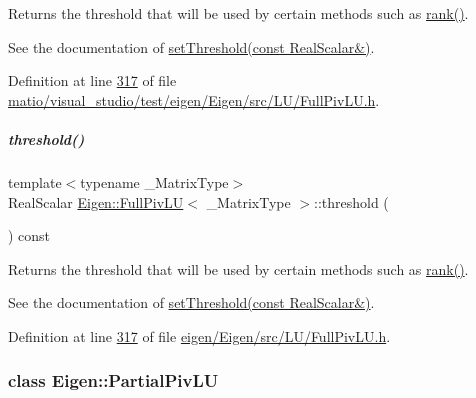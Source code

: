 Returns the threshold that will be used by certain methods such as \hyperlink{group___l_u___module_a67a870aa69e699e058d04802ba0bdad9}{rank()}.

See the documentation of \hyperlink{group___l_u___module_a414592d82de98f5bd075965caf56d681}{set\+Threshold(const Real\+Scalar\&)}. 

Definition at line \hyperlink{matio_2visual__studio_2test_2eigen_2_eigen_2src_2_l_u_2_full_piv_l_u_8h_source_l00317}{317} of file \hyperlink{matio_2visual__studio_2test_2eigen_2_eigen_2src_2_l_u_2_full_piv_l_u_8h_source}{matio/visual\+\_\+studio/test/eigen/\+Eigen/src/\+L\+U/\+Full\+Piv\+L\+U.\+h}.

\mbox{\label{group___l_u___module_ad77539203694f2d85ff7d11616e5a0a5}} 
\subparagraph{\texorpdfstring{threshold()}{threshold()}\hspace{0.1cm}{\footnotesize\ttfamily [2/2]}}
{\footnotesize\ttfamily template$<$typename \+\_\+\+Matrix\+Type$>$ \\
Real\+Scalar \hyperlink{group___l_u___module_class_eigen_1_1_full_piv_l_u}{Eigen\+::\+Full\+Piv\+LU}$<$ \+\_\+\+Matrix\+Type $>$\+::threshold (\begin{DoxyParamCaption}{ }\end{DoxyParamCaption}) const\hspace{0.3cm}{\ttfamily [inline]}}

Returns the threshold that will be used by certain methods such as \hyperlink{group___l_u___module_a67a870aa69e699e058d04802ba0bdad9}{rank()}.

See the documentation of \hyperlink{group___l_u___module_a414592d82de98f5bd075965caf56d681}{set\+Threshold(const Real\+Scalar\&)}. 

Definition at line \hyperlink{eigen_2_eigen_2src_2_l_u_2_full_piv_l_u_8h_source_l00317}{317} of file \hyperlink{eigen_2_eigen_2src_2_l_u_2_full_piv_l_u_8h_source}{eigen/\+Eigen/src/\+L\+U/\+Full\+Piv\+L\+U.\+h}.

\label{class_eigen_1_1_partial_piv_l_u}
\subsubsection{class Eigen\+:\+:Partial\+Piv\+LU}

